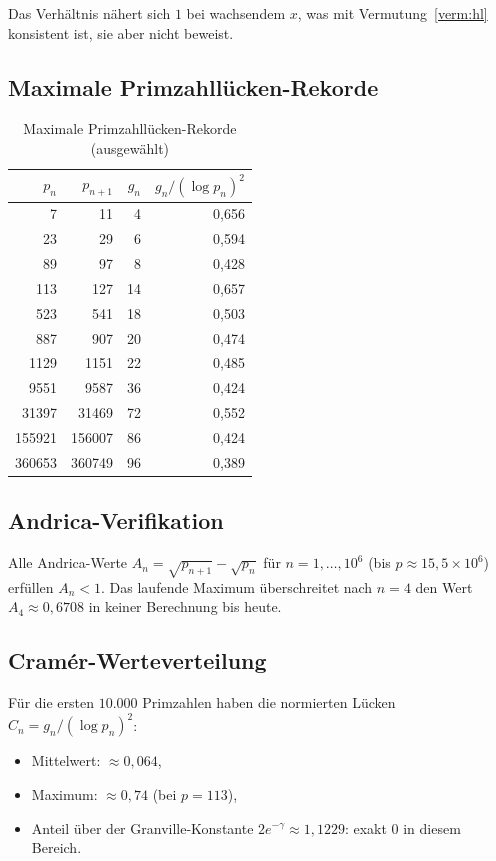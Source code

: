 \documentclass[12pt,a4paper]{amsart}
\theoremstyle{definition}
\begin{document}
Das Verh\"{a}ltnis n\"{a}hert sich $1$ bei wachsendem $x$, was mit
Vermutung~\ref{verm:hl} konsistent ist, sie aber nicht beweist.

\subsection{Maximale Primzahll\"{u}cken-Rekorde}

\begin{table}[h]
\centering
\caption{Maximale Primzahll\"{u}cken-Rekorde (ausgew\"{a}hlt)}
\begin{tabular}{@{}rrrr@{}}
\toprule
$p_n$ & $p_{n+1}$ & $g_n$ & $g_n/(\log p_n)^2$ \\
\midrule
7 & 11 & 4 & 0{,}656 \\
23 & 29 & 6 & 0{,}594 \\
89 & 97 & 8 & 0{,}428 \\
113 & 127 & 14 & 0{,}657 \\
523 & 541 & 18 & 0{,}503 \\
887 & 907 & 20 & 0{,}474 \\
1129 & 1151 & 22 & 0{,}485 \\
9551 & 9587 & 36 & 0{,}424 \\
31397 & 31469 & 72 & 0{,}552 \\
155921 & 156007 & 86 & 0{,}424 \\
360653 & 360749 & 96 & 0{,}389 \\
\bottomrule
\end{tabular}
\end{table}

\subsection{Andrica-Verifikation}

Alle Andrica-Werte $A_n = \sqrt{p_{n+1}} - \sqrt{p_n}$ f\"{u}r $n = 1, \ldots,
10^6$ (bis $p \approx 15{,}5 \times 10^6$) erf\"{u}llen $A_n < 1$. Das laufende
Maximum \"{u}berschreitet nach $n = 4$ den Wert $A_4 \approx 0{,}6708$ in keiner
Berechnung bis heute.

\subsection{Cram\'{e}r-Werteverteilung}

F\"{u}r die ersten $10{.}000$ Primzahlen haben die normierten L\"{u}cken
$C_n = g_n/(\log p_n)^2$:
\begin{itemize}
  \item Mittelwert: $\approx 0{,}064$,
  \item Maximum: $\approx 0{,}74$ (bei $p = 113$),
  \item Anteil \"{u}ber der Granville-Konstante $2e^{-\gamma} \approx 1{,}1229$:
        exakt $0$ in diesem Bereich.
\end{itemize}
\end{document}
